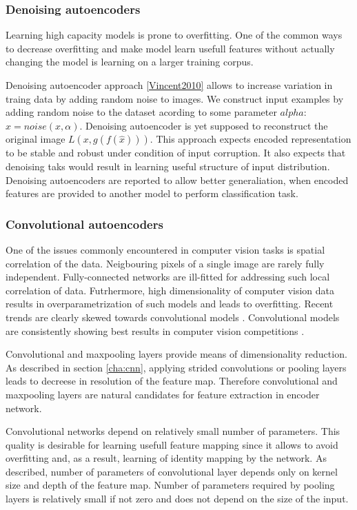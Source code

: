 \subsubsection{Denoising autoencoders}

Learning high capacity models is prone to overfitting.
One of the common ways to decrease overfitting and make model learn usefull features without actually changing the model is learning on a larger training corpus.

Denoising autoencoder approach \ref{Vincent2010} allows to increase variation in traing data by adding random noise to images. We construct input examples by adding random noise to the dataset acording to some parameter $alpha$: $\hat{x}=noise(x, \alpha)$.
Denoising autoencoder is yet supposed to reconstruct  the original image $L(x, g(f(\hat{x})))$.
This approach expects encoded representation to be stable and robust under condition of input corruption.
It also expects that denoising taks would result in learning useful structure of input distribution.
Denoising autoencoders are reported to allow better generaliation, when encoded features are provided to another model to perform classification task.

\subsubsection{Convolutional autoencoders}

One of the issues commonly encountered in computer vision tasks is spatial correlation of the data.
Neigbouring pixels of a single image are rarely fully independent.
Fully-connected networks are ill-fitted for addressing such local correlation of data.
Futrhermore, high dimensionality of computer vision data results in overparametrization of such models and leads to overfitting.
Recent trends are clearly skewed towards convolutional models \cite{He2015, Szegedy2016}.
Convolutional models are consistently showing best results in computer vision competitions \cite{ILSVRC15, Zhou2016}.

Convolutional and maxpooling layers provide means of dimensionality reduction.
As described in section \ref{cha:cnn}, applying strided convolutions or pooling layers leads to decreese in resolution of the feature map.
Therefore convolutional and maxpooling layers are natural candidates for feature extraction in encoder network.

Convolutional networks depend on relatively small number of parameters.
This quality is desirable for learning usefull feature mapping since it allows to avoid overfitting and, as a result, learning of identity mapping by the network.
As described, number of parameters of convolutional layer depends only on kernel size and depth of the feature map.
Number of parameters required by pooling layers is relatively small if not zero and does not depend on the size of the input.

